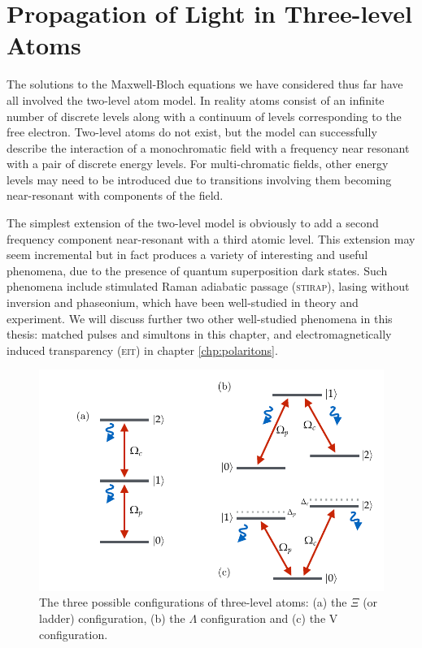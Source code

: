 \section{Propagation of Light in Three-level Atoms}
  \label{sec:nonlinear_threelevel}

    The solutions to the Maxwell-Bloch equations we have considered thus far
    have all involved the two-level atom model. In reality atoms consist of an
    infinite number of discrete levels along with a continuum of levels
    corresponding to the free electron. Two-level atoms do not exist, but the
    model can successfully describe the interaction of a monochromatic field
    with a frequency near resonant with a pair of discrete energy levels. For
    multi-chromatic fields, other energy levels may need to be introduced due to
    transitions involving them becoming near-resonant with components of the
    field.

    The simplest extension of the two-level model is obviously to add a second
    frequency component near-resonant with a third atomic level. This extension
    may seem incremental but in fact produces a variety of interesting and
    useful phenomena, due to the presence of quantum superposition dark states.
    Such phenomena include stimulated Raman adiabatic passage
    (\textsc{stirap})\cite{Grigoryan2001,Unanyan1998}, lasing without
    inversion\cite{Blok1990,Imamoglu1989,Scully1989} and
    phaseonium\cite{Scully1991,Eberly1996}, which have been well-studied in
    theory and experiment. We will discuss further two other well-studied
    phenomena in this thesis: matched pulses and simultons in this chapter, and
    electromagnetically induced transparency (\textsc{eit}) in chapter
    \ref{chp:polaritons}.

    \begin{figure}[]
      \includegraphics[width=\linewidth]
        {figs/03_nonlinear/three_level_diagrams_2.pdf}
      \caption{
      The three possible configurations of three-level atoms: (a) the $\Xi$ (or
      ladder) configuration, (b) the $\Lambda$ configuration and (c) the V
      configuration.
      }
      \label{fig:three_level_diagrams}
    \end{figure}


